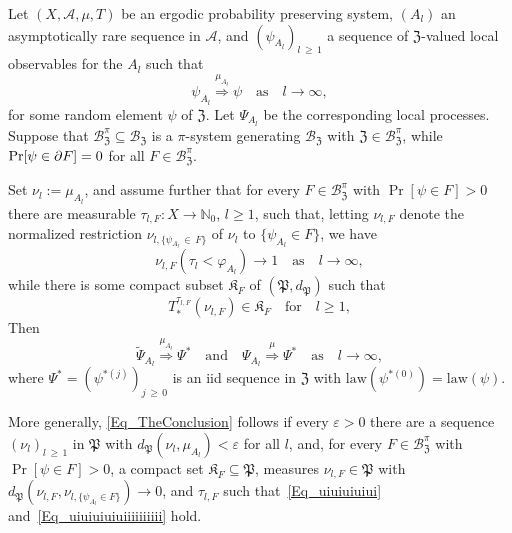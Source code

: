 \documentclass[AHL,Unicode,longabstracts]{cedram}
\newcommand{\clA}{\mathcal{A}}
\newcommand{\clB}{\mathcal{B}}
\newcommand{\law}{\mathrm{law}}
\newcommand{\frkK}{\mathfrak{K}}
\newcommand{\frkP}{\mathfrak{P}}
\newcommand{\frkZ}{\mathfrak{Z}}
\newcommand{\bbN}{\mathbb{N}}
\begin{document}
\begin{theo}\label{T_AsyIntStateProcIndep}
Let $(X,\clA,\mu,T)$ be an ergodic probability preserving system, $(A_{l})$ an asymptotically rare sequence in $\clA$, and $(\psi_{A_{l} })_{l\,\geq\,1}$ a sequence of $\frkZ$-valued local observables for the $A_{l}$ such that
\begin{equation}
\psi_{A_{l}}\overset{\mu_{A_{l}}}{\Longrightarrow}\psi \quad \text{as}\quad l\rightarrow\infty,
\end{equation}
for some random element $\psi$ of $\frkZ$. Let $\Psi_{A_{l}}$ be the corresponding local processes. Suppose that $\clB_{\frkZ}^{\pi }\subseteq\clB_{\frkZ}$ is a $\pi$-system generating $\clB_{\frkZ}$ with $\frkZ\in\clB_{\frkZ }^{\pi}$, while $\Pr[\psi\in\partial F]\linebreak =0$ for all $F\in\clB _{\frkZ}^{\pi}$.

Set $\nu_{l}:=\mu_{A_{l}}$, and assume further that for every $F\in\clB_{\frkZ}^{\pi}$ with $\Pr[\psi\in F]>0$ there are measurable $\tau_{l,F}:X\rightarrow\bbN_{0}$, $l\geq1$, such that, letting $\nu_{l,F}$ denote the normalized restriction $\nu_{l,\{\psi_{A_{l}}\,\in\,F\}}$ of $\nu_{l}$ to $\{\psi_{A_{l}}\in F\}$, we have
\begin{equation}\label{Eq_uiuiuiuiui}
\nu_{l,F}\left(\tau_{l}<\varphi_{A_{l}}\right) \longrightarrow 1\quad\text{as}\quad l\rightarrow\infty,
\end{equation}
while there is some compact subset $\frkK_{F}$ of $(\frkP,d_{\frkP})$ such that
\begin{equation}\label{Eq_uiuiuiuiuiiiiiiiiii}
T_{\ast}^{\tau_{l,F}}(\nu_{l,F})\in\frkK_{F}\quad \text{for}\quad l\geq1,
\end{equation}
Then
\begin{equation}\label{Eq_TheConclusion}
\widetilde{\Psi}_{A_{l}}\overset{\mu_{A_{l}}}{\Longrightarrow}\Psi^{\ast }\quad\text{and}\quad\Psi_{A_{l}}\overset{\mu}{\Longrightarrow}\Psi^{\ast }\quad \text{as}\quad l\rightarrow\infty, 
\end{equation}
where $\Psi^{\ast}=(\psi^{\ast(j)})_{j\,\geq\,0}$ is an iid sequence in $\frkZ$ with $\law(\psi^{\ast(0)})=\law(\psi)$.

More generally, \eqref{Eq_TheConclusion} follows if every $\varepsilon>0$ there are a sequence $(\nu_{l})_{l\,\geq\,1}$ in $\frkP$ with $d_{\frkP}(\nu_{l},\mu_{A_{l}})<\varepsilon$ for all $l$, and, for every $F\in\clB_{\frkZ}^{\pi}$ with $\Pr[\psi\in F]>0$, a compact set $\frkK_{F}\subseteq\frkP$, measures $\nu_{l,F}
\in\frkP$ with $d_{\frkP}(\nu_{l,F},\nu_{l,\{\psi_{A_{l}}\in F\}})\rightarrow0$, and $\tau_{l,F}$ such that~\eqref{Eq_uiuiuiuiui} and~\eqref{Eq_uiuiuiuiuiiiiiiiiii} hold.
\end{theo}
\end{document}
